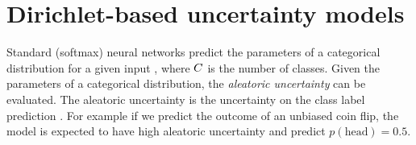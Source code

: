 \section{Dirichlet-based uncertainty models}
\label{sec:dirichlet_models}
%
Standard (softmax) neural networks predict the parameters of a categorical distribution  for a given input , where $C$ is the number of classes. 
Given the parameters of a categorical distribution, the \emph{ aleatoric uncertainty} can be evaluated. The aleatoric uncertainty is the uncertainty on the class label prediction . For example if we predict the outcome of an unbiased coin flip, the model is expected to have high aleatoric uncertainty and predict $p(\text{head})=0.5$.

\begin{table*}[ht]
	\centering
	\caption{Summary of DBU models. Further details on the loss functions are provided in the appendix.}
	\label{tab:dirichlet_models}
\end{table*}


